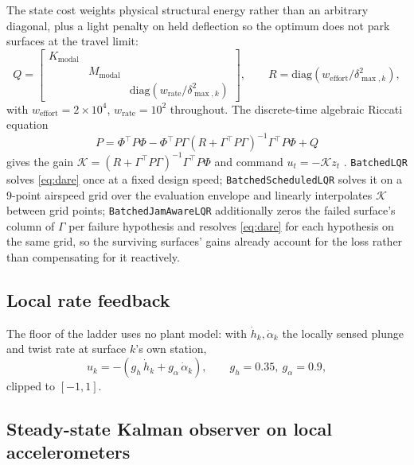 \documentclass[11pt]{article}
\begin{document}
The state cost weights physical structural energy rather than an arbitrary
diagonal, plus a light penalty on held deflection so the optimum does not park
surfaces at the travel limit:
\begin{equation}
Q = \begin{bmatrix} K_{\mathrm{modal}} & & \\ & M_{\mathrm{modal}} & \\ & & \mathrm{diag}\!\left(w_{\mathrm{rate}}/\delta_{\max,k}^2\right) \end{bmatrix},
\qquad
R = \mathrm{diag}\!\left(w_{\mathrm{effort}}/\delta_{\max,k}^2\right),
\label{eq:lqrcost}
\end{equation}
with $w_{\mathrm{effort}}=2{\times}10^4$, $w_{\mathrm{rate}}=10^2$ throughout.
The discrete-time algebraic Riccati equation
\begin{equation}
P = \Phi^{\!\top} P \Phi - \Phi^{\!\top} P \Gamma \left(R+\Gamma^{\!\top} P \Gamma\right)^{-1} \Gamma^{\!\top} P \Phi + Q
\label{eq:dare}
\end{equation}
gives the gain $\mathcal{K}=(R+\Gamma^{\!\top} P \Gamma)^{-1}\Gamma^{\!\top} P \Phi$
and command $u_t=-\mathcal{K} z_t$ \citep{anderson2007optimal}.
\texttt{BatchedLQR} solves \eqref{eq:dare} once at a fixed design speed;
\texttt{BatchedScheduledLQR} solves it on a 9-point airspeed grid over
the evaluation envelope and linearly interpolates $\mathcal{K}$ between grid
points; \texttt{BatchedJamAwareLQR} additionally zeros the failed surface's
column of $\Gamma$ per failure hypothesis and resolves \eqref{eq:dare} for each
hypothesis on the same grid, so the surviving surfaces' gains already account
for the loss rather than compensating for it reactively.

\subsection*{Local rate feedback}

The floor of the ladder uses no plant model: with $\dot h_k,\dot\alpha_k$ the
locally sensed plunge and twist rate at surface $k$'s own station,
\begin{equation}
u_k = -\left(g_h\,\dot h_k + g_\alpha\,\dot\alpha_k\right), \qquad g_h=0.35,\ g_\alpha=0.9,
\label{eq:ratefeedback}
\end{equation}
clipped to $[-1,1]$.

\subsection*{Steady-state Kalman observer on local accelerometers}
\end{document}
